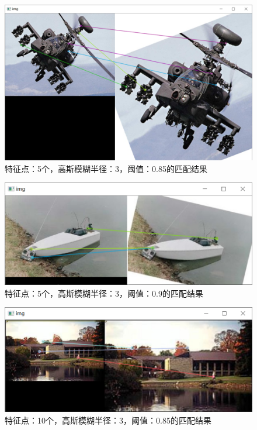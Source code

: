 \documentclass{article}
\begin{document}
\begin{figure}[htbp]
\centering
\includegraphics[width=13.5cm]{img/2.png}
\caption{特征点：5个，高斯模糊半径：3，阈值：0.85的匹配结果}
\label{fig1}
\end{figure}

\begin{figure}[htbp]
\centering
\includegraphics[width=13.5cm]{img/1.png}
\caption{特征点：5个，高斯模糊半径：3，阈值：0.9的匹配结果}
\label{fig2}
\end{figure}

\begin{figure}[htbp]
\centering
\includegraphics[width=13.5cm]{img/3.png}
\caption{特征点：10个，高斯模糊半径：3，阈值：0.85的匹配结果}
\label{fig3}
\end{figure}
\end{document}
